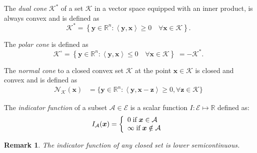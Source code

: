\documentclass[AMA,STIX1COL]{WileyNJD-v2}
\newcommand{\vect}[1]{\bm{#1}}
\newtheorem*{remark*}{Remark}
\begin{document}
\begin{definition}
The \textit{dual cone} $\mathcal{K}^*$ of a set $\mathcal{K}$ in a vector space equipped with an inner product, is always convex and is defined as
\begin{equation}
\label{eq:dualcone}
\mathcal{K}^* 
= \left \{ \vect{y} \in \mathbb{R}^n: \left\langle \vect{y}, \vect{x} \right\rangle \geq 0 \quad \forall \vect{x} \in \mathcal{K}  \right \}.
\end{equation}
\end{definition}

\begin{definition}
The \textit{polar cone} is defined as
\begin{equation}
\label{eq:polarcone}
\mathcal{K}^\circ 
= \left \{ \vect{y} \in \mathbb{R}^n: \left\langle \vect{y}, \vect{x} \right\rangle \leq 0 \quad \forall \vect{x} \in \mathcal{K}  \right \} 
\; =   -\mathcal{K}^*.
\end{equation}
\end{definition}

\begin{definition}
The \textit{normal cone} to a closed convex set $\mathcal{K}$ at the point $\vect{x}\in\mathcal{K}$ is
closed and convex and is defined as
\begin{align}
\label{eq:normalcone}
\mathcal{N}_{\mathcal{K}}(\vect{x}) 
&= \{ \vect{y} \in \mathbb{R}^n : \left\langle \vect{y}, \vect{x} - \vect{z} \right\rangle \geq 0, \forall \vect{z} \in \mathcal{K} \} 
\end{align}
\end{definition}

\begin{definition}
The \textit{indicator function} of a subset $\mathcal{A} \in \mathcal{E}$ is a scalar function $I: \mathcal{E} \mapsto \mathbb{R}$
defined as:
\begin{equation}
\label{eq:indicator}
{I}_{\mathcal{A}}(\vect{x}) = 
\left\{ 
\begin{array}[pos]{l}
0     \;  \text{if} \; \vect{x} \in \mathcal{A} \\
\infty   \; \text{if} \; \vect{x} \notin \mathcal{A}
\end{array}
\right.
\end{equation}
\end{definition}

\begin{remark*}
The indicator function of any closed set is lower semicontinuous.
\end{remark*}
\end{document}
